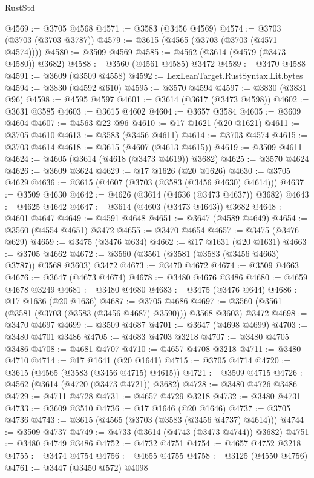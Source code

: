 \begin{lexlean}{RustStd}
\begin{coremodule}
@4569 := @3705 @4568
@4571 := @3583 (@3456 @4569)
@4574 := @3703 (@3703 (@3703 @3787))
@4579 := @3615 (@4565 (@3703 (@3703 (@4571 @4574))))
@4580 := @3509 @4569
@4585 := @4562 (@3614 (@4579 (@3473 @4580)) @3682)
@4588 := @3560 (@4561 @4585) @3472
@4589 := @3470 @4588
@4591 := @3609 (@3509 @4558)
@4592 := LexLeanTarget.RustSyntax.Lit.bytes
@4594 := @3830 (@4592 @610)
@4595 := @3570 @4594
@4597 := @3830 (@3831 @96)
@4598 := @4595 @4597
@4601 := @3614 (@3617 (@3473 @4598))
@4602 := @3631 @3585
@4603 := @3615 @4602
@4604 := @3657 @3584
@4605 := @3609 @4604
@4607 := @4563 @22 @96
@4610 := @17 @1621 (@20 @1621)
@4611 := @3705 @4610
@4613 := @3583 (@3456 @4611)
@4614 := @3703 @4574
@4615 := @3703 @4614
@4618 := @3615 (@4607 (@4613 @4615))
@4619 := @3509 @4611
@4624 := @4605 (@3614 (@4618 (@3473 @4619)) @3682)
@4625 := @3570 @4624
@4626 := @3609 @3624
@4629 := @17 @1626 (@20 @1626)
@4630 := @3705 @4629
@4636 := @3615 (@4607 (@3703 (@3583 (@3456 @4630) @4614)))
@4637 := @3509 @4630
@4642 := @4626 (@3614 (@4636 (@3473 @4637)) @3682)
@4643 := @4625 @4642
@4647 := @3614 (@4603 (@3473 @4643)) @3682
@4648 := @4601 @4647
@4649 := @4591 @4648
@4651 := @3647 (@4589 @4649)
@4654 := @3560 (@4554 @4651) @3472
@4655 := @3470 @4654
@4657 := @3475 (@3476 @629)
@4659 := @3475 (@3476 @634)
@4662 := @17 @1631 (@20 @1631)
@4663 := @3705 @4662
@4672 := @3560 (@3561 (@3581 (@3583 (@3456 @4663) @3787)) @3568 @3603) @3472
@4673 := @3470 @4672
@4674 := @3509 @4663
@4676 := @3647 (@4673 @4674)
@4678 := @3480 @4676 @3486
@4680 := @4659 @4678 @3249
@4681 := @3480 @4680
@4683 := @3475 (@3476 @644)
@4686 := @17 @1636 (@20 @1636)
@4687 := @3705 @4686
@4697 := @3560 (@3561 (@3581 (@3703 (@3583 (@3456 @4687) @3590))) @3568 @3603) @3472
@4698 := @3470 @4697
@4699 := @3509 @4687
@4701 := @3647 (@4698 @4699)
@4703 := @3480 @4701 @3486
@4705 := @4683 @4703 @3218
@4707 := @3480 @4705 @3486
@4708 := @4681 @4707
@4710 := @4657 @4708 @3218
@4711 := @3480 @4710
@4714 := @17 @1641 (@20 @1641)
@4715 := @3705 @4714
@4720 := @3615 (@4565 (@3583 (@3456 @4715) @4615))
@4721 := @3509 @4715
@4726 := @4562 (@3614 (@4720 (@3473 @4721)) @3682)
@4728 := @3480 @4726 @3486
@4729 := @4711 @4728
@4731 := @4657 @4729 @3218
@4732 := @3480 @4731
@4733 := @3609 @3510
@4736 := @17 @1646 (@20 @1646)
@4737 := @3705 @4736
@4743 := @3615 (@4565 (@3703 (@3583 (@3456 @4737) @4614)))
@4744 := @3509 @4737
@4749 := @4733 (@3614 (@4743 (@3473 @4744)) @3682)
@4751 := @3480 @4749 @3486
@4752 := @4732 @4751
@4754 := @4657 @4752 @3218
@4755 := @3474 @4754
@4756 := @4655 @4755
@4758 := @3125 (@4550 @4756)
@4761 := @3447 (@3450 @572) @4098

\end{coremodule}
\end{lexlean}
